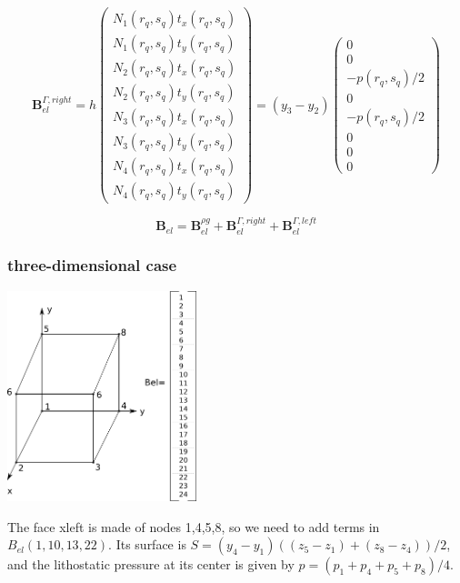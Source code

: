 \[
{\bm B}^{\Gamma,right}_{el} =
h
\left(
\begin{array}{c}
N_1(r_q,s_q) t_x(r_q,s_q) \\
N_1(r_q,s_q) t_y(r_q,s_q) \\
N_2(r_q,s_q) t_x(r_q,s_q) \\
N_2(r_q,s_q) t_y(r_q,s_q) \\
N_3(r_q,s_q) t_x(r_q,s_q) \\
N_3(r_q,s_q) t_y(r_q,s_q) \\
N_4(r_q,s_q) t_x(r_q,s_q) \\
N_4(r_q,s_q) t_y(r_q,s_q) 
\end{array}
\right)
=
(y_3-y_2)
\left(
\begin{array}{c}
0\\
0\\
-p(r_q,s_q)/2 \\
0\\
-p(r_q,s_q)/2 \\
0\\
0\\
0
\end{array}
\right)
\] 


\[
{\bm B}_{el} =
{\bm B}_{el}^{\rho g} + 
{\bm B}^{\Gamma,right}_{el} + 
{\bm B}^{\Gamma,left}_{el} 
\]

\subsubsection{three-dimensional case}

\begin{center}
\includegraphics[width=5.5cm]{images/openbc/drawing3D.png}
\end{center}

The face xleft is made of nodes 1,4,5,8, so we need 
to add terms in $B_{el}(1,10,13,22)$. Its surface is 
$S=(y_4-y_1)((z_5-z_1)+(z_8-z_4))/2$, and the lithostatic pressure 
at its center is given by $p=(p_1+p_4+p_5+p_8)/4$.

